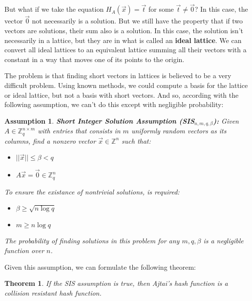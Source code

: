 \documentclass[a4paper]{article}
\newtheorem{theorem}{Theorem}
\newtheorem{assumption}{Assumption}
\begin{document}
But what if we take the equation
$H_A(\overrightarrow{x})=\overrightarrow{t}$ for some
$\overrightarrow{t}\neq\overrightarrow{0}$? In this case, the vector
$\overrightarrow{0}$ not necessarily is a solution. But we still have
the property that if two vectors are solutions, their sum also is a
solution. In this case, the solution isn't necessarily in a lattice,
but they are in what is called an \textbf{ideal lattice}. We can
convert all ideal lattices to an equivalent lattice summing all their
vectors with a constant in a way that moves one of its points to the
origin.

The problem is that finding short vectors in lattices is believed to
be a very difficult problem. Using known methods, we could compute a
basis for the lattice or ideal lattice, but not a basis with short
vectors. And so, according with the following assumption, we can't do
this except with negligible probability:

\begin{assumption}
\textbf{Short Integer Solution Assumption (SIS$_{n, m, q, \beta}$):
}Given $A \in \mathbb{Z}_q^{n \times m}$ with entries that consists in
$m$ uniformly random vectors as its columns, find a nonzero vector
$\overrightarrow{x} \in \mathbb{Z}^n$ such that:

\begin{itemize}
    \item $||\overrightarrow{x}||\leq \beta < q$
    \item $A\overrightarrow{x}=\overrightarrow{0} \in \mathbb{Z}_q^n$
\end{itemize}

To ensure the existance of nontrivial solutions, is required:

\begin{itemize}
    \item $\beta \geq \sqrt{n\log q}$
    \item $m \geq n \log q$
\end{itemize}

The probability of finding solutions in this problem for any $m, q,
\beta$ is a negligible function over $n$.
\end{assumption}

Given this assumption, we can formulate the following theorem:

\begin{theorem}
  If the SIS assumption is true, then Ajtai's hash function is a
  collision resistant hash function.
\end{theorem}
\end{document}
